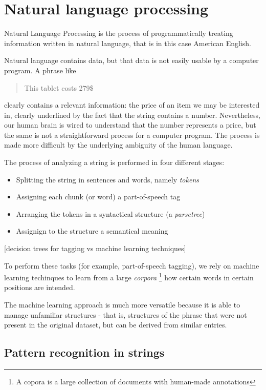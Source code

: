 \documentclass[LaM,binding=0.6cm]{sapthesis}
\begin{document}
\section{Natural language processing}

Natural Language Processing is the process of programmatically treating information written in natural language, that is in this case American English. 

Natural language contains data, but that data is not easily usable by a computer program. A phrase like

\begin{quote}
This tablet costs 279\$
\end{quote}

clearly contains a relevant information: the price of an item we may be interested in, clearly underlined by the fact that the string contains a number. Nevertheless, our human brain is wired to understand that the number represents a price, but the same is not a straightforward process for a computer program. The process is made more difficult by the underlying ambiguity of the human language. 

The process of analyzing a string is performed in four different stages:
\begin{itemize}
	\item Splitting the string in sentences and words, namely \textit{tokens}
	\item Assigning each chunk (or word) a part-of-speech tag
	\item Arranging the tokens in a syntactical structure (a \textit{parsetree})
	\item Assignign to the structure a semantical meaning
\end{itemize}

[decision trees for tagging vs machine learning techniques]

To perform these tasks (for example, part-of-speech tagging), we rely on machine learning techinques to learn from a large \textit{corpora} \footnote{A copora is a large collection of documents with human-made annotations} how certain words in certain positions are intended.

The machine learning approach is much more versatile because it is able to manage unfamiliar structures - that is, structures of the phrase that were not present in the original dataset, but can be derived from similar entries.

\subsection{Pattern recognition in strings}
\end{document}
